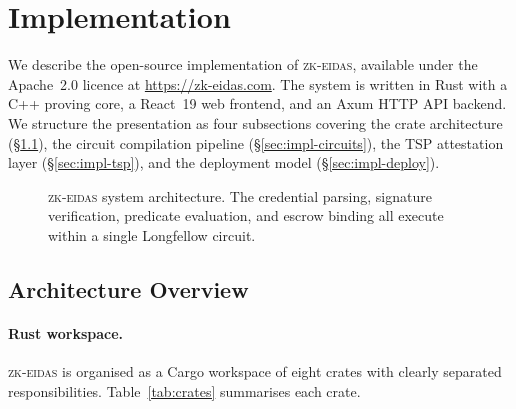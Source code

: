 \section{Implementation}\label{sec:implementation}

We describe the open-source implementation of \textsc{zk-eidas}, available under the Apache~2.0
licence at \url{https://zk-eidas.com}.
The system is written in Rust with a C++ proving core, a React~19 web frontend, and an Axum
HTTP API backend.
We structure the presentation as four subsections covering the crate architecture
(\S\ref{sec:impl-arch}), the circuit compilation pipeline (\S\ref{sec:impl-circuits}),
the TSP attestation layer (\S\ref{sec:impl-tsp}), and the deployment model
(\S\ref{sec:impl-deploy}).

\begin{figure}[t]
\centering

\caption{\textsc{zk-eidas} system architecture. The credential parsing, signature verification, predicate evaluation, and escrow binding all execute within a single Longfellow circuit.}
\label{fig:architecture}
\end{figure}

\subsection{Architecture Overview}\label{sec:impl-arch}

\paragraph{Rust workspace.}
\textsc{zk-eidas} is organised as a Cargo workspace of eight crates with clearly separated
responsibilities.
Table~\ref{tab:crates} summarises each crate.

